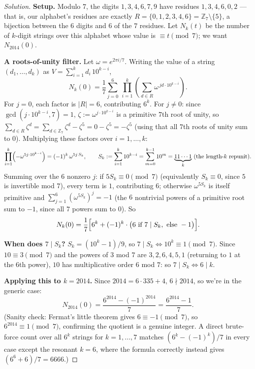 \documentclass[11pt]{article}
\theoremstyle{definition}
\newcommand{\Z}{\mathbb{Z}}
\begin{document}
\begin{proof}[Solution]
\textbf{Setup.} Modulo $7$, the digits $1,3,4,6,7,9$ have residues $1,3,4,6,0,2$ — that is, our alphabet's residues are exactly $R=\{0,1,2,3,4,6\}=\Z_7\setminus\{5\}$, a bijection between the $6$ digits and $6$ of the $7$ residues. Let $N_k(t)$ be the number of $k$-digit strings over this alphabet whose value is $\equiv t\pmod7$; we want $N_{2014}(0)$.

\textbf{A roots-of-unity filter.} Let $\omega=e^{2\pi i/7}$. Writing the value of a string $(d_1,\dots,d_k)$ as $V=\sum_{i=1}^kd_i\,10^{k-i}$,
\[
N_k(0)=\frac17\sum_{j=0}^{6}\ \prod_{i=1}^{k}\left(\sum_{d\in R}\omega^{\,jd\cdot10^{k-i}}\right).
\]
For $j=0$, each factor is $|R|=6$, contributing $6^k$. For $j\ne0$: since $\gcd(j\cdot10^{k-i},7)=1$, $\zeta:=\omega^{j\cdot10^{k-i}}$ is a primitive $7$th root of unity, so $\sum_{d\in R}\zeta^d=\sum_{d\in\Z_7}\zeta^d-\zeta^5=0-\zeta^5=-\zeta^5$ (using that all $7$th roots of unity sum to $0$). Multiplying these factors over $i=1,\dots,k$:
\[
\prod_{i=1}^k\Bigl(-\omega^{5j\cdot10^{k-i}}\Bigr)=(-1)^k\,\omega^{5j\,S_k},\qquad S_k:=\sum_{i=1}^k10^{k-i}=\sum_{m=0}^{k-1}10^m=\underbrace{11\cdots1}_{k}\ (\text{the length-}k\text{ repunit}).
\]
Summing over the $6$ nonzero $j$: if $5S_k\equiv0\pmod7$ (equivalently $S_k\equiv0$, since $5$ is invertible mod $7$), every term is $1$, contributing $6$; otherwise $\omega^{5S_k}$ is itself primitive and $\sum_{j=1}^6(\omega^{5S_k})^j=-1$ (the $6$ nontrivial powers of a primitive root sum to $-1$, since all $7$ powers sum to $0$). So
\[
N_k(0)=\frac17\Bigl[6^k+(-1)^k\cdot\bigl(6\text{ if }7\mid S_k,\text{ else }-1\bigr)\Bigr].
\]

\textbf{When does $7\mid S_k$?} $S_k=(10^k-1)/9$, so $7\mid S_k\iff10^k\equiv1\pmod7$. Since $10\equiv3\pmod7$ and the powers of $3$ mod $7$ are $3,2,6,4,5,1$ (returning to $1$ at the $6$th power), $10$ has multiplicative order $6$ mod $7$: so $7\mid S_k\iff6\mid k$.

\textbf{Applying this to $k=2014$.} Since $2014=6\cdot335+4$, $6\nmid2014$, so we're in the generic case:
\[
N_{2014}(0)=\frac{6^{2014}-(-1)^{2014}}{7}=\boxed{\frac{6^{2014}-1}{7}}.
\]
(Sanity check: Fermat's little theorem gives $6\equiv-1\pmod7$, so $6^{2014}\equiv1\pmod7$, confirming the quotient is a genuine integer. A direct brute-force count over all $6^k$ strings for $k=1,\dots,7$ matches $(6^k-(-1)^k)/7$ in every case except the resonant $k=6$, where the formula correctly instead gives $(6^6+6)/7=6666$.)
\end{proof}
\end{document}
